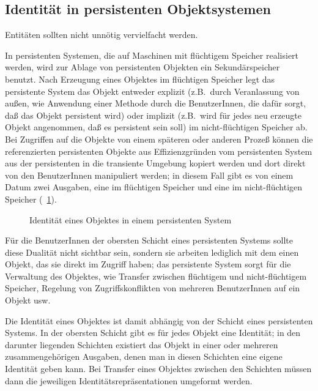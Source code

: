 \subsection{Identit\"{a}t in persistenten Objektsystemen}
%
\begin{fortune}
Entit\"{a}ten sollten nicht unn\"{o}tig vervielfacht werden.
\end{fortune}
%
In persistenten Systemen, die auf Maschinen mit fl\"{u}chtigem Speicher
realisiert werden, wird zur Ablage von persistenten Objekten ein
Sekund\"{a}rspeicher benutzt. Nach Erzeugung eines Objektes im
fl\"{u}chtigen Speicher legt das persistente System das Objekt entweder
explizit (z.B.\ durch Veranlassung von au\ss{}en, wie Anwendung einer
Methode durch die BenutzerInnen, die daf\"{u}r sorgt, da\ss{} das Objekt
persistent wird) oder implizit (z.B.\ wird f\"{u}r jedes neu
erzeugte Objekt angenommen, da\ss{} es persistent sein soll) im
nicht-fl\"{u}chtigen Speicher ab. Bei Zugriffen auf die Objekte 
von einem sp\"{a}teren oder anderen Proze\ss{} k\"{o}nnen die
referenzierten persistenten Objekte aus Effizienzgr\"{u}nden vom
persistenten System aus der persistenten in die transiente Umgebung
kopiert werden und dort direkt von den BenutzerInnen manipuliert
werden; in diesem Fall gibt es von einem Datum zwei
\rglq{}Ausgaben\rgrq{}, eine im fl\"{u}chtigen Speicher und eine im
nicht-fl\"{u}chtigen Speicher (\figurename~\ref{fig:periden}).
%
\begin{figure}[hbtp]%
\ifbuch%
\centerline{}%
\else%
\centerline{}%
\fi%
\caption{Identit\"{a}t eines Objektes in einem persistenten System}%
\label{fig:periden}%
\end{figure}%
%
F\"{u}r die BenutzerInnen der obersten Schicht eines persistenten Systems
sollte diese Dualit\"{a}t nicht sichtbar sein, sondern sie arbeiten
lediglich mit dem einen Objekt, das sie direkt im Zugriff haben; das
persistente System sorgt f\"{u}r die Verwaltung des Objektes, wie
Transfer zwischen fl\"{u}chtigem und nicht-fl\"{u}chtigem Speicher, Regelung
von Zugriffskonflikten von mehreren BenutzerInnen auf ein Objekt usw.
%
\par{}Die Identit\"{a}t eines Objektes ist damit abh\"{a}ngig von der
Schicht eines persistenten Systems. In der obersten Schicht gibt es
f\"{u}r jedes Objekt eine Identit\"{a}t; in den darunter liegenden Schichten
existiert das Objekt in einer oder mehreren zusammengeh\"{o}rigen
\rglq{}Ausgaben\rgrq{}, denen man in diesen Schichten eine eigene
Identit\"{a}t geben kann. Bei Transfer eines Objektes zwischen den
Schichten m\"{u}ssen dann die jeweiligen Identit\"{a}tsrepr\"{a}sentationen
umgeformt werden.
%

